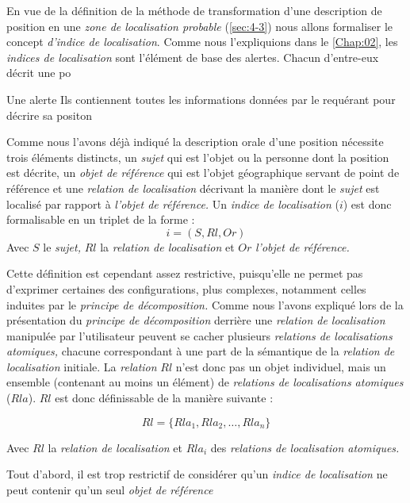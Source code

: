 En vue de la définition de la méthode de transformation d'une
description de position en une \emph{zone de localisation probable}
(\autoref{sec:4-3}) nous allons formaliser le concept \emph{d'indice
  de localisation}. Comme nous l'expliquions dans le
\autoref{Chap:02}, les \emph{indices de localisation} sont l'élément
de base des alertes. Chacun d'entre-eux décrit une po


Une alerte 
Ils contiennent toutes les informations données par le requérant pour
décrire sa positon

Comme nous l'avons déjà indiqué la description orale d'une position
nécessite trois éléments distincts, un \emph{sujet} qui est l'objet ou
la personne dont la position est décrite, un \emph{objet de référence}
qui est l'objet géographique servant de point de référence et une
\emph{relation de localisation} décrivant la manière dont le
\emph{sujet} est localisé par rapport à \emph{l'objet de référence.}
Un \emph{indice de localisation} (\(i\)) est donc formalisable en un
triplet de la forme :
%
\begin{equation}
  i = (S, Rl, Or)
\end{equation}
%
Avec \(S\) le \emph{sujet,} \(Rl\) la \emph{relation de localisation}
et \(Or\) \emph{l'objet de référence.}

Cette définition est cependant assez restrictive, puisqu'elle ne
permet pas d'exprimer certaines des configurations, plus complexes,
notamment celles induites par le \emph{principe de décomposition.}
Comme nous l'avons expliqué lors de la présentation du \emph{principe
  de décomposition} derrière une \emph{relation de localisation}
manipulée par l'utilisateur peuvent se cacher plusieurs
\emph{relations de localisations atomiques,} chacune correspondant à
une part de la sémantique de la \emph{relation de localisation}
initiale. La \emph{relation} \(Rl\) n'est donc pas un objet
individuel, mais un ensemble (contenant au moins un élément) de
\emph{relations de localisations atomiques} (\(Rla\)). \(Rl\) est donc
définissable de la manière suivante :

\begin{equation}
  Rl = \{Rla_1, Rla_2, \ldots, Rla_n\}
\end{equation}

Avec \(Rl\) la \emph{relation de localisation} et \(Rla_i\) des
\emph{relations de localisation atomiques.}

Tout d'abord, il est trop restrictif de considérer qu'un \emph{indice
  de localisation} ne peut contenir qu'un seul \emph{objet de
  référence}

